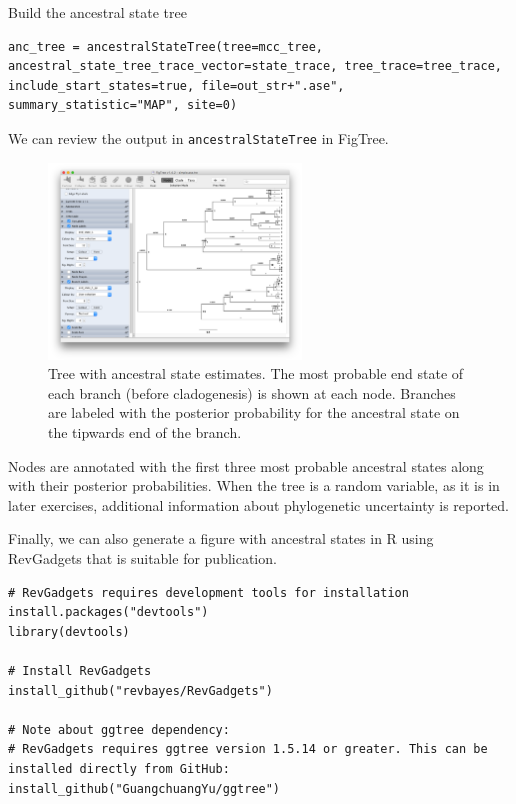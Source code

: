 Build the ancestral state tree

\begin{snugshade}
\begin{lstlisting}
anc_tree = ancestralStateTree(tree=mcc_tree, ancestral_state_tree_trace_vector=state_trace, tree_trace=tree_trace, include_start_states=true, file=out_str+".ase", summary_statistic="MAP", site=0)
\end{lstlisting}
\end{snugshade}

We can review the output in {\tt ancestralStateTree} in FigTree.

\begin{figure}[!ht]
\centering
\includegraphics[width=0.6\textwidth]{figures/fig_simple_FigTree_ase.png}
\caption{Tree with ancestral state estimates. The most probable end state of each branch (before cladogenesis) is shown at each node. Branches are labeled with the posterior probability for the ancestral state on the tipwards end of the branch.}
\end{figure}


Nodes are annotated with the first three most probable ancestral states along with their posterior probabilities.
When the tree is a random variable, as it is in later exercises, additional information about phylogenetic uncertainty is reported.

Finally, we can also generate a figure with ancestral states in R using RevGadgets that is suitable for publication.

\begin{snugshade}
\begin{lstlisting}
# RevGadgets requires development tools for installation
install.packages("devtools")
library(devtools)

# Install RevGadgets
install_github("revbayes/RevGadgets")

# Note about ggtree dependency:
# RevGadgets requires ggtree version 1.5.14 or greater. This can be installed directly from GitHub:
install_github("GuangchuangYu/ggtree")
\end{lstlisting}
\end{snugshade}

